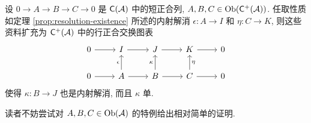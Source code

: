 \begin{proposition}[马蹄引理]\label{prop:horseshoe}
	设 $0 \to A \to B \to C \to 0$ 是 $\mathsf{C}(\mathcal{A})$ 中的短正合列, $A, B, C \in \operatorname{Ob}(\mathsf{C}^+(\mathcal{A}))$. 任取性质如定理 \ref{prop:resolution-existence} 所述的内射解消 $\epsilon: A \to I$ 和 $\eta: C \to K$, 则这些资料扩充为 $\mathsf{C}^+(\mathcal{A})$ 中的行正合交换图表
	\[\begin{tikzcd}
		0 \arrow[r] & I \arrow[r] & J \arrow[r] & K \arrow[r] & 0 \\
		0 \arrow[r] & A \arrow[r] \arrow[u, "\epsilon"] & B \arrow[r] \arrow[u, "\kappa"] & C \arrow[r] \arrow[u, "\eta"'] & 0 
	\end{tikzcd}\]
	使得 $\kappa: B \to J$ 也是内射解消, 而且 $\kappa$ 单.
\end{proposition}

读者不妨尝试对 $A, B, C \in \operatorname{Ob}(\mathcal{A})$ 的特例给出相对简单的证明.

